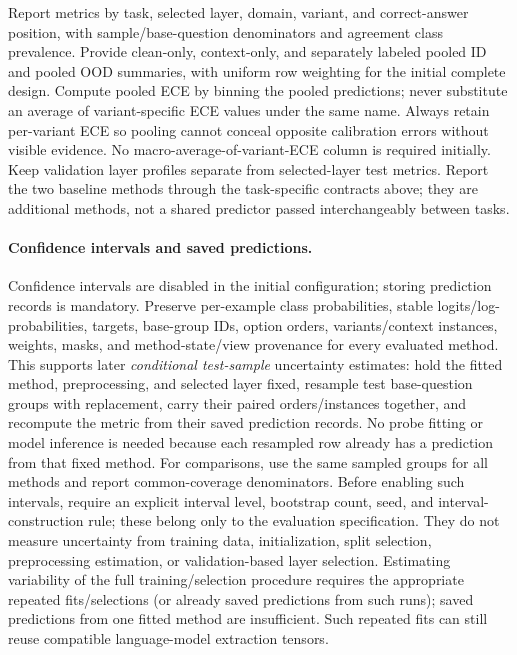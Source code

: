 \documentclass[11pt]{article}
\begin{document}
Report metrics by task, selected layer, domain, variant, and correct-answer position, with sample/base-question denominators and agreement class prevalence.
Provide clean-only, context-only, and separately labeled pooled ID and pooled OOD summaries, with uniform row weighting for the initial complete design.
Compute pooled ECE by binning the pooled predictions; never substitute an average of variant-specific ECE values under the same name.
Always retain per-variant ECE so pooling cannot conceal opposite calibration errors without visible evidence.
No macro-average-of-variant-ECE column is required initially.
Keep validation layer profiles separate from selected-layer test metrics.
Report the two baseline methods through the task-specific contracts above; they are additional methods, not a shared predictor passed interchangeably between tasks.

\paragraph{Confidence intervals and saved predictions.}
Confidence intervals are disabled in the initial configuration; storing prediction records is mandatory.
Preserve per-example class probabilities, stable logits/log-probabilities, targets, base-group IDs, option orders, variants/context instances, weights, masks, and method-state/view provenance for every evaluated method.
This supports later \emph{conditional test-sample} uncertainty estimates: hold the fitted method, preprocessing, and selected layer fixed, resample test base-question groups with replacement, carry their paired orders/instances together, and recompute the metric from their saved prediction records.
No probe fitting or model inference is needed because each resampled row already has a prediction from that fixed method.
For comparisons, use the same sampled groups for all methods and report common-coverage denominators.
Before enabling such intervals, require an explicit interval level, bootstrap count, seed, and interval-construction rule; these belong only to the evaluation specification.
They do not measure uncertainty from training data, initialization, split selection, preprocessing estimation, or validation-based layer selection.
Estimating variability of the full training/selection procedure requires the appropriate repeated fits/selections (or already saved predictions from such runs); saved predictions from one fitted method are insufficient.
Such repeated fits can still reuse compatible language-model extraction tensors.
\end{document}
